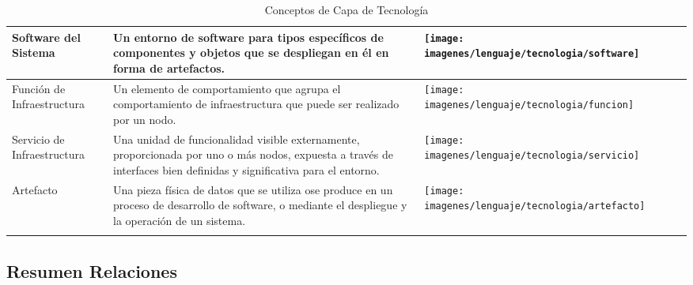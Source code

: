 \begin{center}
\begin{longtable}{| >{\centering\arraybackslash}m{3cm} | >{\arraybackslash}m{6cm} | p{4cm} | p{5cm} | p{4cm} |}
		Software del Sistema & 
		\vspace{1mm} Un entorno de software para tipos específicos de componentes y objetos que	se despliegan en él en forma de artefactos.& 
		\texttt{[image: imagenes/lenguaje/tecnologia/software]}  \\ 
		\hline 
		
		Función de Infraestructura &
		\vspace{1mm} Un elemento de comportamiento que agrupa el comportamiento de infraestructura que puede ser realizado por un	nodo.& 
		\texttt{[image: imagenes/lenguaje/tecnologia/funcion]}  \\ 
		\hline 	
		
		Servicio de Infraestructura &
		\vspace{1mm} Una unidad de funcionalidad visible externamente, proporcionada por uno o más nodos, expuesta a través de interfaces bien definidas y significativa para el entorno.		&  
		\texttt{[image: imagenes/lenguaje/tecnologia/servicio]} \\ 
		\hline 
		
		Artefacto &
		\vspace{1mm} Una pieza física de datos que se utiliza ose produce en un proceso de desarrollo de software, o mediante el despliegue y la operación de un sistema.&
		\texttt{[image: imagenes/lenguaje/tecnologia/artefacto]}  \\ 
		\hline
		

	\caption{Conceptos de Capa de Tecnología}
	
\end{longtable}
\end{center}


\subsection{Resumen Relaciones}

